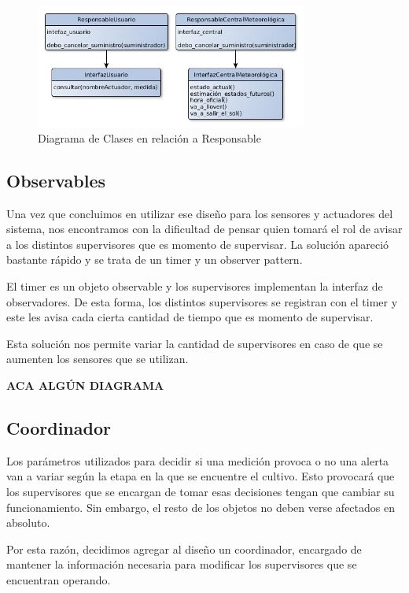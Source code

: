 \begin{figure}[h!]
  \centering
  \includegraphics[width=0.8\textwidth]{./imagenes/clases.jpg}
  \caption{Diagrama de Clases en relación a Responsable}
  \label{fig:clases_resp}
\end{figure}

\subsection{Observables}

Una vez que concluimos en utilizar ese diseño para los sensores y actuadores del sistema, nos encontramos con la dificultad de pensar quien tomará el rol de avisar a los distintos supervisores que es momento de supervisar. La solución apareció bastante rápido y se trata de un timer y un observer pattern.

El timer es un objeto observable y los supervisores implementan la interfaz de observadores. De esta forma, los distintos supervisores se registran con el timer y este les avisa cada cierta cantidad de tiempo que es momento de supervisar.

Esta solución nos permite variar la cantidad de supervisores en caso de que se aumenten los sensores que se utilizan.

\textbf{ACA ALGÚN DIAGRAMA}

\subsection{Coordinador}
Los parámetros utilizados para decidir si una medición provoca o no una alerta van a variar según la etapa en la que se encuentre el cultivo. Esto provocará que los supervisores que se encargan de tomar esas decisiones tengan que cambiar su funcionamiento. Sin embargo, el resto de los objetos no deben verse afectados en absoluto.

Por esta razón, decidimos agregar al diseño un coordinador, encargado de mantener la información necesaria para modificar los supervisores que se encuentran operando. 

